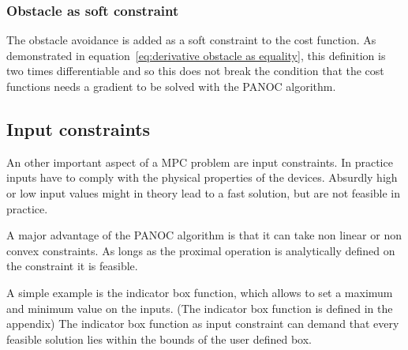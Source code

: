 			\subsubsection{Obstacle as soft constraint}
				The obstacle avoidance is added as a soft constraint to the cost function. As demonstrated in equation~\ref{eq:derivative obstacle as equality}, this definition is two times differentiable and so this does not break the condition that the cost functions needs a gradient to be solved with the PANOC algorithm.
			
		\subsection{Input constraints}
			An other important aspect of a MPC problem are input constraints. In practice inputs have to comply with the physical properties of the devices. Absurdly high or low input values might in theory lead to a fast solution, but are not feasible in practice.
			
			A major advantage of the PANOC algorithm is that it can take non linear or non convex constraints. As longs as the proximal operation is analytically defined on the constraint it is feasible. 
			
			A simple example is the indicator box function, which allows to set a maximum and minimum value on the inputs. (The indicator box function is defined in the appendix) The indicator box function as input constraint can demand that every feasible solution lies within the bounds of the user defined box.